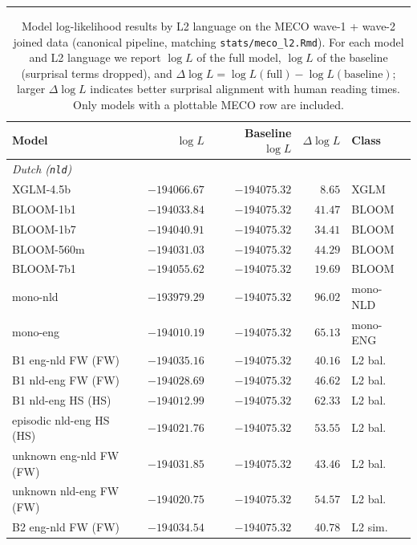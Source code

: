\noindent\rule{\linewidth}{0.4pt}




\newpage 



\begin{table}[t]
  \centering
  \small
  \caption{Model log-likelihood results by L2 language on the MECO wave-1 + wave-2 joined data (canonical pipeline, matching \texttt{stats/meco\_l2.Rmd}). For each model and L2 language we report $\log L$ of the full model, $\log L$ of the baseline (surprisal terms dropped), and $\Delta\log L = \log L(\text{full}) - \log L(\text{baseline})$; larger $\Delta\log L$ indicates better surprisal alignment with human reading times. Only models with a plottable MECO row are included.}
  \label{tab:meco_langrows}
  \begin{tabular}{lrrrl}
    \toprule
    Model & $\log L$ & Baseline $\log L$ & $\Delta\log L$ & Class \\
    \midrule
    \multicolumn{5}{l}{\textit{Dutch (\texttt{nld})}} \\
    \midrule
    XGLM-4.5b & $-194066.67$ & $-194075.32$ & $8.65$ & XGLM \\
    BLOOM-1b1 & $-194033.84$ & $-194075.32$ & $41.47$ & BLOOM \\
    BLOOM-1b7 & $-194040.91$ & $-194075.32$ & $34.41$ & BLOOM \\
    BLOOM-560m & $-194031.03$ & $-194075.32$ & $44.29$ & BLOOM \\
    BLOOM-7b1 & $-194055.62$ & $-194075.32$ & $19.69$ & BLOOM \\
    mono-nld & $-193979.29$ & $-194075.32$ & $96.02$ & mono-NLD \\
    mono-eng & $-194010.19$ & $-194075.32$ & $65.13$ & mono-ENG \\
    B1 eng-nld FW (FW) & $-194035.16$ & $-194075.32$ & $40.16$ & L2 bal. \\
    B1 nld-eng FW (FW) & $-194028.69$ & $-194075.32$ & $46.62$ & L2 bal. \\
    B1 nld-eng HS (HS) & $-194012.99$ & $-194075.32$ & $62.33$ & L2 bal. \\
    episodic nld-eng HS (HS) & $-194021.76$ & $-194075.32$ & $53.55$ & L2 bal. \\
    unknown eng-nld FW (FW) & $-194031.85$ & $-194075.32$ & $43.46$ & L2 bal. \\
    unknown nld-eng FW (FW) & $-194020.75$ & $-194075.32$ & $54.57$ & L2 bal. \\
    B2 eng-nld FW (FW) & $-194034.54$ & $-194075.32$ & $40.78$ & L2 sim. \\

\end{tabular}
\end{table}
